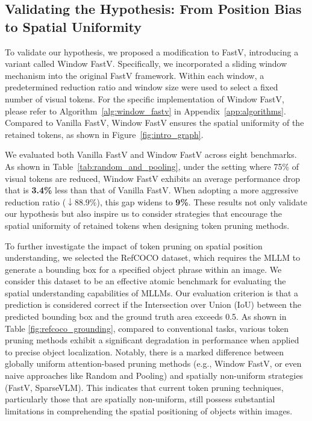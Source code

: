 \subsection{Validating the Hypothesis: From Position Bias to Spatial Uniformity}
To validate our hypothesis, we proposed a modification to FastV, introducing a variant called Window FastV. Specifically, we incorporated a sliding window mechanism into the original FastV framework. Within each window, a predetermined reduction ratio and window size were used to select a fixed number of visual tokens. For the specific implementation of Window FastV, please refer to Algorithm~\ref{alg:window_fastv} in Appendix~\ref{app:algorithms}.
Compared to Vanilla FastV, Window FastV ensures the spatial uniformity of the retained tokens, as shown in Figure~\ref{fig:intro_graph}.


We evaluated both Vanilla FastV and Window FastV across eight benchmarks. As shown in Table~\ref{tab:random_and_pooling}, under the setting where 75\% of visual tokens are reduced, Window FastV exhibits an average performance drop that is \textbf{3.4\%} less than that of Vanilla FastV. When adopting a more aggressive reduction ratio (\(\downarrow 88.9\%\)), this gap widens to \textbf{9\%}. These results not only validate our hypothesis but also inspire us to consider strategies that encourage the spatial uniformity of retained tokens when designing token pruning methods. 

To further investigate the impact of token pruning on spatial position understanding, we selected the RefCOCO \citep{yu2016modelingcontextreferringexpressions} dataset, which requires the MLLM to generate a bounding box for a specified object phrase within an image. We consider this dataset to be an effective atomic benchmark for evaluating the spatial understanding capabilities of MLLMs. Our evaluation criterion is that a prediction is considered correct if the Intersection over Union (IoU) between the predicted bounding box and the ground truth area exceeds 0.5. As shown in Table \ref{fig:refcoco_grounding}, compared to conventional tasks, various token pruning methods exhibit a significant degradation in performance when applied to precise object localization. Notably, there is a marked difference between globally uniform attention-based pruning methods (e.g., Window FastV, or even naive approaches like Random and Pooling) and spatially non-uniform strategies (FastV, SparseVLM). This indicates that current token pruning techniques, particularly those that are spatially non-uniform, still possess substantial limitations in comprehending the spatial positioning of objects within images.

